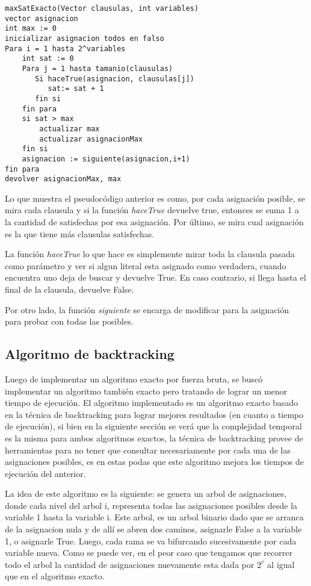\documentclass[a4paper,10pt]{article}
\begin{document}
\begin{verbatim}
maxSatExacto(Vector clausulas, int variables)
vector asignacion
int max := 0
inicializar asignacion todos en falso
Para i = 1 hasta 2^variables
    int sat := 0
    Para j = 1 hasta tamanio(clausulas)
       Si haceTrue(asignacion, clausulas[j])
          sat:= sat + 1
       fin si
    fin para
    si sat > max
        actualizar max
        actualizar asignacionMax
    fin si
    asignacion := siguiente(asignacion,i+1)
fin para
devolver asignacionMax, max
\end{verbatim}

Lo que muestra el pseudoc\'odigo anterior es como, por cada asignaci\'on posible, se mira cada clausula y si la funci\'on \emph{haceTrue} devuelve true, entonces se suma 1 a la cantidad de satisfechas por esa asignaci\'on. Por \'ultimo, se mira cual asignaci\'on es la que tiene m\'as clausulas satisfechas.

La funci\'on \emph{haceTrue} lo que hace es simplemente mirar toda la clausula pasada como par\'ametro y ver si algun literal esta asignado como verdadera, cuando encuentra uno deja de buscar y devuelve True. En caso contrario, si llega hasta el final de la clausula, devuelve False. 

Por otro lado, la funci\'on \emph{siguiente} se encarga de modificar para la asignaci\'on para probar con todas las posibles.

\subsection*{Algoritmo de backtracking}

Luego de implementar un algoritmo exacto por fuerza bruta, se busc\'o implementar un algoritmo tambi\'en exacto pero tratando de lograr un menor tiempo de ejecuci\'on. El algoritmo implementado es un algoritmo exacto basado en la t\'ecnica de backtracking para lograr mejores resultados (en cuanto a tiempo de ejecuci\'on), si bien en la siguiente secci\'on se ver\'a que la complejidad temporal es la misma para ambos algoritmos exactos, la t\'ecnica de backtracking provee de herramientas para no tener que consultar necesariamente por cada una de las asignaciones posibles, es en estas podas que este algoritmo mejora los tiempos de ejecuci\'on del anterior.

\bigskip

La idea de este algoritmo es la siguiente: se genera un arbol de asignaciones, donde cada nivel del arbol i, representa todas las asignaciones posibles desde la variable 1 hasta la variable i. Este arbol, es un arbol binario dado que se arranca de la asignacion nula y de all\'i se abren dos caminos, asignarle False a la variable 1, o asignarle True. Luego, cada rama se va bifurcando sucesivamente por cada variable nueva. Como se puede ver, en el peor caso que tengamos que recorrer todo el arbol la cantidad de asignaciones nuevamente esta dada por $2^{v}$ al igual que en el algoritmo exacto.
\end{document}
